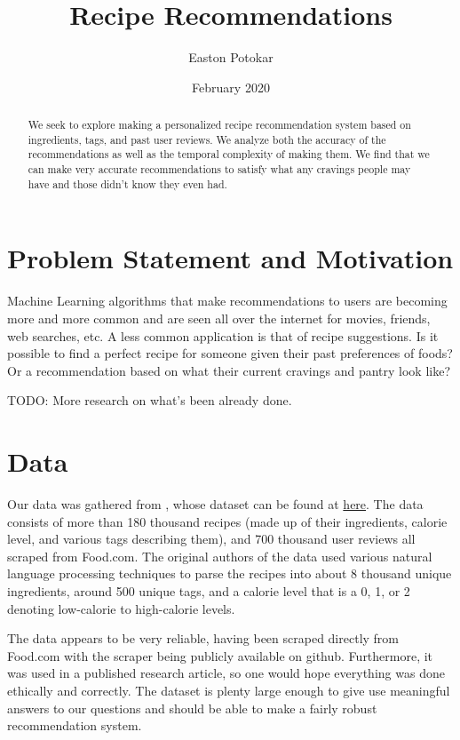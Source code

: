 \documentclass[11pt]{article}
\title{Recipe Recommendations}
\author{Easton Potokar}
\date{February 2020}
\begin{document}
\maketitle

\begin{abstract}
    We seek to explore making a personalized recipe recommendation system based on ingredients, tags, and past user reviews. We analyze both the accuracy of the recommendations as well as the temporal complexity of making them. We find that we can make very accurate recommendations to satisfy what any cravings people may have and those didn't know they even had.
\end{abstract}

\section{Problem Statement and Motivation}
Machine Learning algorithms that make recommendations to users are becoming more and more common and are seen all over the internet for movies, friends, web searches, etc. A less common application is that of recipe suggestions. Is it possible to find a perfect recipe for someone given their past preferences of foods? Or a recommendation based on what their current cravings and pantry look like? 

TODO: More research on what's been already done.

\section{Data}
Our data was gathered from \cite{data}, whose dataset can be found at \href{https://www.kaggle.com/shuyangli94/food-com-recipes-and-user-interactions}{here}. The data consists of more than 180 thousand recipes (made up of their ingredients, calorie level, and various tags describing them), and 700 thousand user reviews all scraped from Food.com. The original authors of the data used various natural language processing techniques to parse the recipes into about 8 thousand unique ingredients, around 500 unique tags, and a calorie level that is a 0, 1, or 2 denoting low-calorie to high-calorie levels.

The data appears to be very reliable, having been scraped directly from Food.com with the scraper being publicly available on github. Furthermore, it was used in a published research article, so one would hope everything was done ethically and correctly. The dataset is plenty large enough to give use meaningful answers to our questions and should be able to make a fairly robust recommendation system. 
\end{document}
